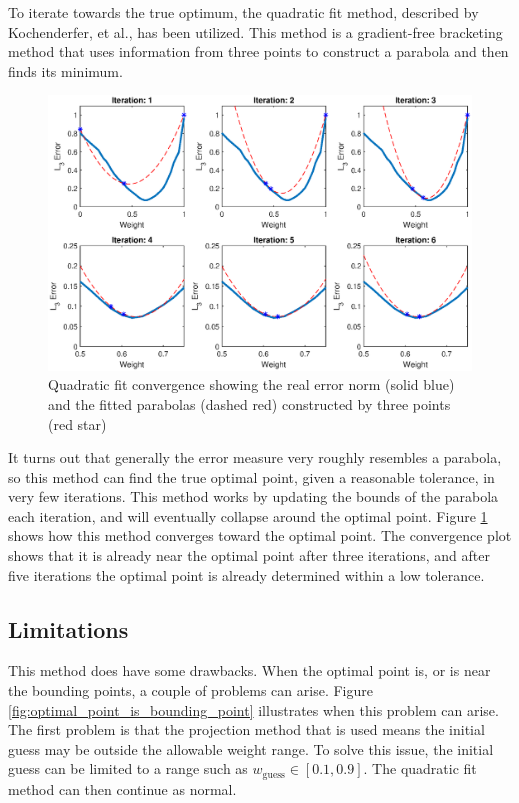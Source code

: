 To iterate towards the true optimum, the quadratic fit method, described by Kochenderfer, et al., \cite{Kochenderfer_Wheeler_2019} has been utilized. This method is a gradient-free bracketing method that uses information from three points to construct a parabola and then finds its minimum.
\begin{figure}[ht]
    \centering
    \includegraphics[width=0.85\linewidth]{figures/chapter_5/QuadraticFitConvergence.eps}
    \caption{Quadratic fit convergence showing the real error norm (solid blue) and the fitted parabolas (dashed red) constructed by three points (red star)}
    \label{fig:quadratic_fit_method}
\end{figure}

It turns out that generally the error measure very roughly resembles a parabola, so this method can find the true optimal point, given a reasonable tolerance, in very few iterations. This method works by updating the bounds of the parabola each iteration, and will eventually collapse around the optimal point. Figure \ref{fig:quadratic_fit_method} shows how this method converges toward the optimal point. The convergence plot shows that it is already near the optimal point after three iterations, and after five iterations the optimal point is already determined within a low tolerance. 

\subsection*{Limitations}
This method does have some drawbacks. When the optimal point is, or is near the bounding points, a couple of problems can arise. Figure \ref{fig:optimal_point_is_bounding_point} illustrates when this problem can arise. The first problem is that the projection method that is used means the initial guess may be outside the allowable weight range. To solve this issue, the initial guess can be limited to a range such as $w_\text{guess} \in [0.1, 0.9]$. The quadratic fit method can then continue as normal.

